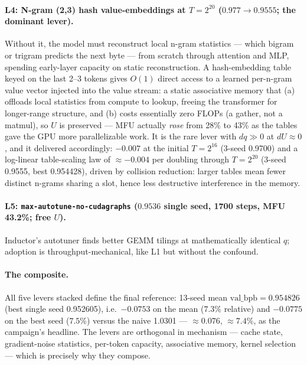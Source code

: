 \documentclass{article}
\newcommand{\valbpb}{\mathrm{val\_bpb}}
\begin{document}
\paragraph{L4: N-gram (2,3) hash value-embeddings at $T = 2^{20}$ ($0.977 \rightarrow 0.9555$; the dominant lever).}
Without it, the model must reconstruct local n-gram statistics --- which bigram or trigram predicts the next byte --- from scratch through attention and MLP, spending early-layer capacity on static reconstruction. A hash-embedding table \cite{svenstrup2017hash,engram2026} keyed on the last 2--3 tokens gives $O(1)$ direct access to a learned per-n-gram value vector injected into the value stream: a static associative memory that (a) offloads local statistics from compute to lookup, freeing the transformer for longer-range structure, and (b) costs essentially zero FLOPs (a gather, not a matmul), so $U$ is preserved --- MFU actually \emph{rose} from 28\% to 43\% as the tables gave the GPU more parallelizable work. It is the rare lever with $dq \gg 0$ at $dU \approx 0$, and it delivered accordingly: $-0.007$ at the initial $T = 2^{16}$ (3-seed 0.9700) and a log-linear table-scaling law of $\approx -0.004$ per doubling through $T = 2^{20}$ (3-seed 0.9555, best 0.954428), driven by collision reduction: larger tables mean fewer distinct n-grams sharing a slot, hence less destructive interference in the memory.

\paragraph{L5: \texttt{max-autotune-no-cudagraphs} ($0.9536$ single seed, 1700 steps, MFU 43.2\%; free $U$).}
Inductor's autotuner finds better GEMM tilings at mathematically identical $q$; adoption is throughput-mechanical, like L1 but without the confound.

\paragraph{The composite.} All five levers stacked define the final reference: 13-seed mean $\valbpb = 0.954826$ (best single seed 0.952605), i.e.\ $-0.0753$ on the mean ($7.3\%$ relative) and $-0.0775$ on the best seed ($7.5\%$) versus the naive 1.0301 --- $\approx 0.076$, $\approx 7.4\%$, as the campaign's headline. The levers are orthogonal in mechanism --- cache state, gradient-noise statistics, per-token capacity, associative memory, kernel selection --- which is precisely why they compose.
\end{document}
